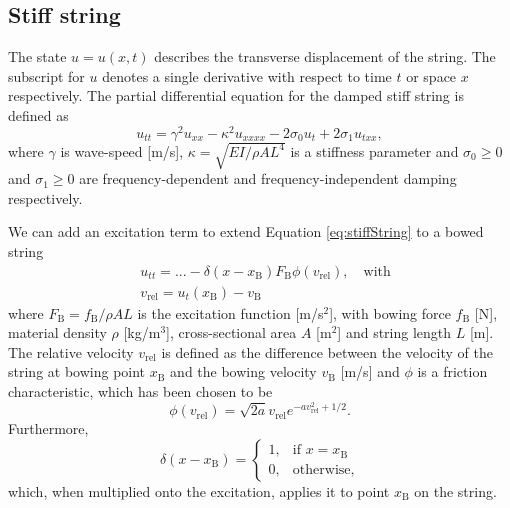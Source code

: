 \documentclass{article}
\begin{document}
\subsection{Stiff string}\label{subsec:stiffStringPDE}
The state $u = u(x,t)$ describes the transverse displacement of the string. The subscript for $u$ denotes a single derivative with respect to time $t$ or space $x$ respectively. The partial differential equation for the damped stiff string is defined as \cite{Bilbao2009:NumericalSoundSynthesis} 
\begin{equation}\label{eq:stiffString}
    u_{tt} = \gamma^2 u_{xx}-\kappa^2u_{xxxx} - 2\sigma_0u_{t} + 2\sigma_1u_{txx},
\end{equation}
where $\gamma$ is wave-speed [m/s], $\kappa = \sqrt{EI/\rho AL^4}$ is a stiffness parameter
and $\sigma_0 \geq 0$ and $\sigma_1 \geq 0$ are frequency-dependent and frequency-independent damping respectively.

We can add an excitation term to extend Equation \eqref{eq:stiffString} to a bowed string \cite{Bilbao2009:NumericalSoundSynthesis} 
\begin{align}
    \label{eq:bowedString} &u_{tt} = ... - \delta(x-x_\text{B})F_\text{B}\phi(v_\text{rel}), \quad \text{with} \\
    &v_\text{rel} = u_t(x_\text{B}) - v_\text{B}
\end{align}
where $F_\text{B} = f_\text{B}/ \rho AL$ is the excitation function [m/s$^2$], with bowing force $f_\text{B}$ [N], material density $\rho$ [kg/m$^3$], cross-sectional area $A$ [m$^2$] and string length $L$ [m]. The relative velocity $v_\text{rel}$ is defined as the difference between the velocity of the string at bowing point $x_\text{B}$ and the bowing velocity $v_\text{B}$ [m/s] and $\phi$ is a friction characteristic, which has been chosen to be \cite{Bilbao2009:NumericalSoundSynthesis}
\begin{equation}
    \phi(v_\text{rel}) = \sqrt{2a}v_\text{rel} e^{-av_\text{rel}^2+1/2}.
\end{equation}
Furthermore,
\begin{equation} \label{eq:dirac}
    \delta(x-x_\text{B}) =
\begin{cases}
    1, & \text{if } x=x_\text{B}\\
    0,              & \text{otherwise},
\end{cases}
\end{equation}
which, when multiplied onto the excitation, applies it to point $x_\text{B}$ on the string.
\end{document}
